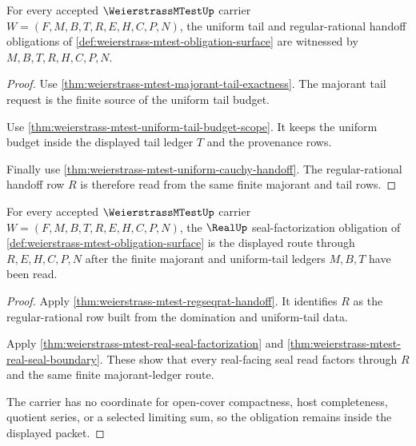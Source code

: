 \begin{theorem}
\label{thm:weierstrass-mtest-uniform-tail-obligation-package}
For every accepted $\WeierstrassMTestUp$ carrier $W=(F,M,B,T,R,E,H,C,P,N)$, the uniform tail and regular-rational handoff obligations of \autoref{def:weierstrass-mtest-obligation-surface} are witnessed by $M,B,T,R,H,C,P,N$.
\end{theorem}
\begin{proof}
Use \autoref{thm:weierstrass-mtest-majorant-tail-exactness}. The majorant tail request is the finite source of the uniform tail budget.

Use \autoref{thm:weierstrass-mtest-uniform-tail-budget-scope}. It keeps the uniform budget inside the displayed tail ledger $T$ and the provenance rows.

Finally use \autoref{thm:weierstrass-mtest-uniform-cauchy-handoff}. The regular-rational handoff row $R$ is therefore read from the same finite majorant and tail rows.
\end{proof}

\begin{theorem}
\label{thm:weierstrass-mtest-real-seal-obligation-package}
For every accepted $\WeierstrassMTestUp$ carrier $W=(F,M,B,T,R,E,H,C,P,N)$, the $\RealUp$ seal-factorization obligation of \autoref{def:weierstrass-mtest-obligation-surface} is the displayed route through $R,E,H,C,P,N$ after the finite majorant and uniform-tail ledgers $M,B,T$ have been read.
\end{theorem}
\begin{proof}
Apply \autoref{thm:weierstrass-mtest-regseqrat-handoff}. It identifies $R$ as the regular-rational row built from the domination and uniform-tail data.

Apply \autoref{thm:weierstrass-mtest-real-seal-factorization} and \autoref{thm:weierstrass-mtest-real-seal-boundary}. These show that every real-facing seal read factors through $R$ and the same finite majorant-ledger route.

The carrier has no coordinate for open-cover compactness, host completeness, quotient series, or a selected limiting sum, so the obligation remains inside the displayed packet.
\end{proof}

